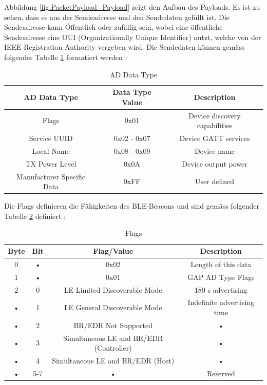Abbildung \ref{fig:PacketPayload_Payload} zeigt den Aufbau des Payloads. Es ist zu sehen, dass es aus der Sendeadresse und den Sendedaten gefüllt ist. Die Sendeadresse kann Öffentlich oder zufällig sein, wobei eine öffentliche Sendeadresse eine OUI (Organizationally Unique Identifier) nutzt, welche von der IEEE Registration Authority vergeben wird. Die Sendedaten können gemäss folgender Tabelle \ref{tab:AD_Data_Type} formatiert werden \cite{9_Teildokument_BT}:\\
\begin{table}
\begin{tabular}{|c|c|c|}
\hline 
\rule[-1ex]{0pt}{2.5ex} AD Data Type & Data Type Value & Description \\ 
\hline 
\rule[-1ex]{0pt}{2.5ex} Flags & 0x01 & Device discovery capabilities \\ 
\hline 
\rule[-1ex]{0pt}{2.5ex} Service UUID & 0x02 - 0x07 & Device GATT services \\ 
\hline 
\rule[-1ex]{0pt}{2.5ex} Local Name & 0x08 - 0x09 & Device name \\ 
\hline 
\rule[-1ex]{0pt}{2.5ex} TX Power Level & 0x0A & Device output power \\ 
\hline 
\rule[-1ex]{0pt}{2.5ex} Manufacturer Specific Data & 0xFF & User defined \\ 
\hline 
\end{tabular} 
\caption[AD Data Type]{AD Data Type}
\label{tab:AD_Data_Type}
\end{table}
Die Flags definieren die Fähigkeiten des BLE-Beacons und sind gemäss folgender Tabelle \ref{tab:Flags} definiert \cite{9_Teildokument_BT}:\\
\begin{table}
\begin{tabular}{|c|c|c|c|}
\hline 
\rule[-1ex]{0pt}{2.5ex} Byte & Bit & Flag/Value & Description \\ 
\hline 
\rule[-1ex]{0pt}{2.5ex} 0 & • & 0x02 & Length of this data \\ 
\hline 
\rule[-1ex]{0pt}{2.5ex} 1 & • & 0x01 & GAP AD Type Flags \\ 
\hline 
\rule[-1ex]{0pt}{2.5ex} 2 & 0 & LE Limited Discoverable Mode & 180 s advertising \\ 
\hline 
\rule[-1ex]{0pt}{2.5ex} • & 1 & LE General Discoverable Mode & Indefinite advertising time \\ 
\hline 
\rule[-1ex]{0pt}{2.5ex} • & 2 & BR/EDR Not Supported & • \\ 
\hline 
\rule[-1ex]{0pt}{2.5ex} • & 3 & Simultaneous LE and BR/EDR (Controller) & • \\ 
\hline 
\rule[-1ex]{0pt}{2.5ex} • & 4 & Simultaneous LE and BR/EDR (Host) & • \\ 
\hline 
\rule[-1ex]{0pt}{2.5ex} • & 5-7 & • & Reserved \\ 
\hline 
\end{tabular} 
\caption[Flags]{Flags}
\label{tab:Flags}
\end{table}
